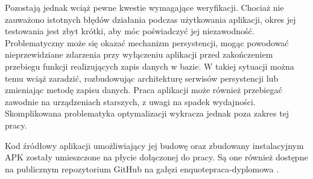 \documentclass[12pt]{article}
\begin{document}
Pozostają jednak wciąż pewne kwestie wymagające weryfikacji. Chociaż nie zauważono istotnych błędów działania podczas użytkowania aplikacji,
okres jej testowania jest zbyt krótki, aby móc poświadczyć jej niezawodność.
Problematyczny może się okazać mechanizm persystencji,
mogąc powodować nieprzewidziane zdarzenia przy wyłączeniu aplikacji przed zakończeniem przebiegu funkcji realizujących zapis danych w bazie.
W takiej sytuacji można temu wciąż zaradzić, rozbudowując architekturę serwisów persystencji lub zmieniając metodę zapisu danych.
Praca aplikacji może również przebiegać zawodnie na urządzeniach starszych, z uwagi na spadek wydajności. Skomplikowana problematyka
optymalizacji wykracza jednak poza zakres tej pracy.

Kod źródłowy aplikacji umożliwiający jej budowę oraz zbudowany instalacyjnym APK zostały umieszczone na płycie dołączonej do pracy.
Są one również dostępne na publicznym repozytorium GitHub na gałęzi enquote{praca-dyplomowa} \cite{source}.

\newpage
{}
\printbibliography

\listoffigures
\end{document}
